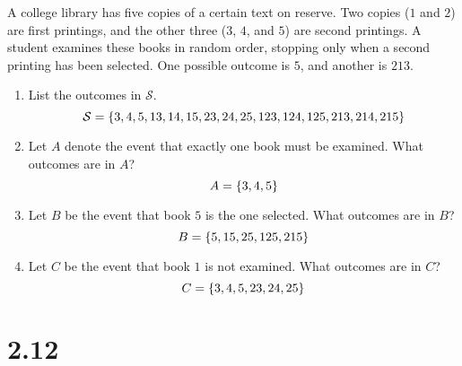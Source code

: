 \documentclass[letterpaper,12pt,fleqn]{article}
\renewcommand{\S}{\mathcal{S}}
\begin{document}
A college library has five copies of a certain text on reserve.  Two copies (\(1\) and \(2\)) are first printings, and the
other three (\(3\), \(4\), and \(5\)) are second printings.  A student examines these books in random order, stopping only
when a second printing has been selected.  One possible outcome is \(5\), and another is \(213\).
\begin{enumerate}[label=\alph*)]
\item List the outcomes in \(\S\).
  \[\S=\set{3,4,5,13,14,15,23,24,25,123,124,125,213,214,215}\]
\item Let \(A\) denote the event that exactly one book must be examined.  What outcomes are in \(A\)?
  \[A=\{3,4,5\}\]
\item Let \(B\) be the event that book \(5\) is the one selected.  What outcomes are in \(B\)?
  \[B=\{5,15,25,125,215\}\]
\item Let \(C\) be the event that book \(1\) is not examined.  What outcomes are in \(C\)?
  \[C=\{3,4,5,23,24,25\}\]
\end{enumerate}

\bigskip

\section*{2.12}
\end{document}
